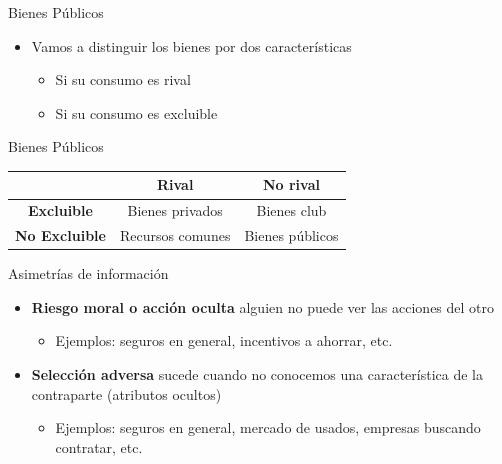 \documentclass{beamer}
\begin{document}
\begin{frame}{Bienes Públicos}
\begin{itemize}
    \item Vamos a distinguir los bienes por dos características
    \begin{itemize}
        \item Si su consumo es rival
        \item Si su consumo es excluible
    \end{itemize}
\end{itemize}
\end{frame}

\begin{frame}{Bienes Públicos}
\begin{table}[]
    \centering
    \begin{tabular}{|c|c|c|}
\hline
                      & \textbf{Rival}   & \textbf{No rival} \\ \hline
\textbf{Excluible}    & Bienes privados  & Bienes club       \\ \hline
\textbf{No Excluible} & Recursos comunes & Bienes públicos   \\ \hline
\end{tabular}
\end{table}
\end{frame}


\begin{frame}{Asimetrías de información}
    \begin{itemize}
        \item {\textbf{Riesgo moral o acción oculta}} alguien no puede ver las acciones del otro
            \begin{itemize}
            \item Ejemplos: seguros en general, incentivos a ahorrar, etc. 
            \end{itemize}
            \vspace{3mm}
        \item {\textbf{Selección adversa}} sucede cuando no conocemos una característica de la contraparte (atributos ocultos)
            \begin{itemize}
            \item Ejemplos: seguros en general, mercado de usados, empresas buscando contratar, etc.  
            \end{itemize}
            \end{itemize}
    \end{frame}
\end{document}
